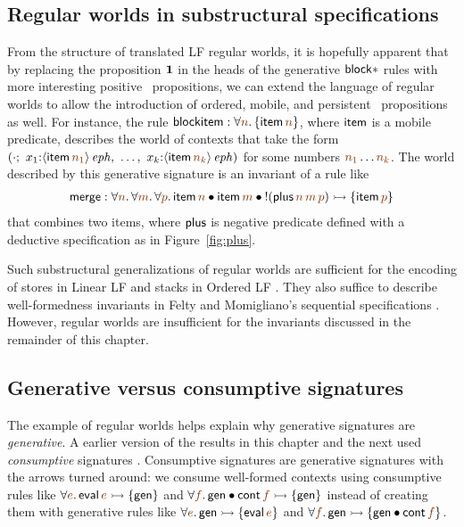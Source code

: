 \subsection{Regular worlds in substructural specifications}

From the structure of translated LF regular worlds, it is hopefully
apparent that by replacing the proposition $\mathbf{1}$ in the heads of the
generative ${\sf block*}$ rules with more interesting positive
\sls~propositions,  we can extend the language of regular
worlds to allow the introduction of ordered, mobile, and persistent
\sls~propositions as well. For instance, the rule
${\sf blockitem} : 
\forall \lf{n}. \, \{ {\sf item}\,\lf{n} \}$,
where ${\sf item}$ is a mobile predicate,
describes the world of contexts that take the form
$\left(\cdot; ~ x_1{:}\iseph{\susp{{\sf item}\,\lf{n_1}}}, ~
         \ldots, ~
         x_k{:}\iseph{\susp{{\sf item}\,\lf{n_k}}}\right)$
for some numbers $\lf{n_1}\ldots\lf{n_k}$. 
The world described by this generative signature is an invariant of a
rule like
\begin{align*}
  {\sf merge} : 
  \forall \lf{n}.\,\forall\lf{m}.\,\forall\lf{p}.\,
   {\sf item}\,\lf{n} \fuse
   {\sf item}\,\lf{m} \fuse
   {!}({\sf plus}\,\lf{n}\,\lf{m}\,\lf{p}) 
    \lefti \{ {\sf item}\,\lf{p} \}
\end{align*}
that combines two items,
where ${\sf plus}$ is  negative predicate defined with a deductive
specification as in
Figure~\ref{fig:plus}.  

Such substructural generalizations of regular worlds are sufficient
for the encoding of stores in Linear LF \cite{cervesato02linear} and
stacks in Ordered LF \cite{polakow01ordered}. They also suffice
to describe well-formedness invariants in Felty and Momigliano's
sequential specifications \cite{felty12hybrid}. However, regular
worlds are insufficient for the
invariants discussed in the remainder of this chapter.

\subsection{Generative versus consumptive signatures}

The example of regular worlds helps explain why generative signatures are
{\it generative}. A earlier version of the results in this chapter and
the next used {\it consumptive} signatures
\cite{simmons10type}. Consumptive signatures are generative
signatures with the arrows turned around: we consume well-formed
contexts using consumptive rules like $\forall\lf{e}.\,{\sf
  eval}\,\lf{e} \lefti \{ {\sf gen} \}$ and $\forall \lf{f}.\,{\sf
  gen} \fuse {\sf cont}\,\lf{f} \lefti \{ {\sf gen} \}$ instead of
creating them with generative 
rules like $\forall\lf{e}.\,{\sf gen}\lefti \{ {\sf eval}\,\lf{e} \}$
and $\forall \lf{f}.\,{\sf gen} \lefti \{ {\sf gen} \fuse {\sf
  cont}\,\lf{f} \}$. 

